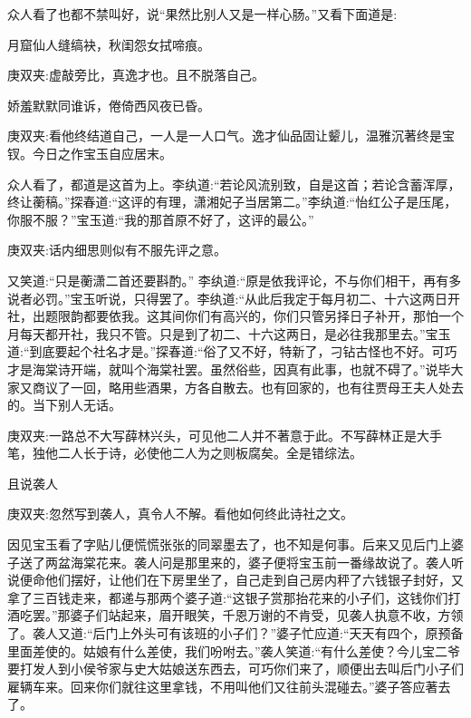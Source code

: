 \begin{parag}
    众人看了也都不禁叫好，说“果然比别人又是一样心肠。”又看下面道是:
\end{parag}


\begin{poem}
    \begin{pl}月窟仙人缝缟袂，秋闺怨女拭啼痕。\end{pl}\begin{note}庚双夹:虚敲旁比，真逸才也。且不脱落自己。\end{note}

    \begin{pl}娇羞默默同谁诉，倦倚西风夜已昏。\end{pl}\begin{note}庚双夹:看他终结道自己，一人是一人口气。逸才仙品固让颦儿，温雅沉著终是宝钗。今日之作宝玉自应居末。\end{note}
\end{poem}


\begin{parag}
    众人看了，都道是这首为上。李纨道:“若论风流别致，自是这首；若论含蓄浑厚，终让蘅稿。”探春道:“这评的有理，潇湘妃子当居第二。”李纨道:“怡红公子是压尾，你服不服？”宝玉道:“我的那首原不好了，这评的最公。”\begin{note}庚双夹:话内细思则似有不服先评之意。\end{note}又笑道:“只是蘅潇二首还要斟酌。” 李纨道:“原是依我评论，不与你们相干，再有多说者必罚。”宝玉听说，只得罢了。李纨道:“从此后我定于每月初二、十六这两日开社，出题限韵都要依我。这其间你们有高兴的，你们只管另择日子补开，那怕一个月每天都开社，我只不管。只是到了初二、十六这两日，是必往我那里去。”宝玉道:“到底要起个社名才是。”探春道:“俗了又不好，特新了，刁钻古怪也不好。可巧才是海棠诗开端，就叫个海棠社罢。虽然俗些，因真有此事，也就不碍了。”说毕大家又商议了一回，略用些酒果，方各自散去。也有回家的，也有往贾母王夫人处去的。当下别人无话。\begin{note}庚双夹:一路总不大写薛林兴头，可见他二人并不著意于此。不写薛林正是大手笔，独他二人长于诗，必使他二人为之则板腐矣。全是错综法。\end{note}
\end{parag}


\begin{parag}
    且说袭人\begin{note}庚双夹:忽然写到袭人，真令人不解。看他如何终此诗社之文。\end{note}因见宝玉看了字贴儿便慌慌张张的同翠墨去了，也不知是何事。后来又见后门上婆子送了两盆海棠花来。袭人问是那里来的，婆子便将宝玉前一番缘故说了。袭人听说便命他们摆好，让他们在下房里坐了，自己走到自己房内秤了六钱银子封好，又拿了三百钱走来，都递与那两个婆子道:“这银子赏那抬花来的小子们，这钱你们打酒吃罢。”那婆子们站起来，眉开眼笑，千恩万谢的不肯受，见袭人执意不收，方领了。袭人又道:“后门上外头可有该班的小子们？”婆子忙应道:“天天有四个，原预备里面差使的。姑娘有什么差使，我们吩咐去。”袭人笑道:“有什么差使？今儿宝二爷要打发人到小侯爷家与史大姑娘送东西去，可巧你们来了，顺便出去叫后门小子们雇辆车来。回来你们就往这里拿钱，不用叫他们又往前头混碰去。”婆子答应著去了。
\end{parag}



